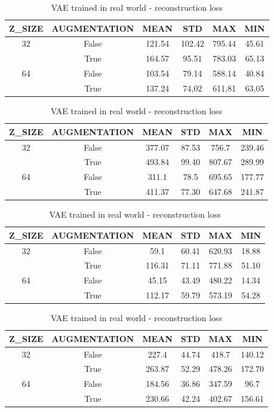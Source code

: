 \begin{table}
  \centering
  \begin{tabular}{|c|c||c|c|c|c|}
  \hline
  Z\_SIZE & AUGMENTATION & MEAN & STD & MAX & MIN \\ \hline
  \multirow{2}{*}{32} & False & 121.54 & 102.42 & 795.44 & 45.61 \\
  & True & 164.57 & 95.51 & 783.03 & 65.13  \\ \hline
  \multirow{2}{*}{64} & False & 103.54 & 79.14 & 588.14 & 40.84 \\
  & True & 137.24 & 74,02 & 611,81 & 63,05  \\ \hline
  \end{tabular}
  \caption{AE trained in simulation - reconstruction loss}
  \label{tab:aesim}

  \begin{tabular}{|c|c||c|c|c|c|}
  \hline
  Z\_SIZE & AUGMENTATION & MEAN & STD & MAX & MIN \\ \hline
  \multirow{2}{*}{32} & False & 377.07 & 87.53 & 756.7 & 239.46 \\
  & True & 493.84 & 99.40 & 807.67 & 289.99  \\ \hline
  \multirow{2}{*}{64} & False & 311.1 & 78.5 & 695.65 & 177.77 \\
  & True & 411.37 & 77.30 & 647.68 & 241.87 \\ \hline
  \end{tabular}
  \caption{AE trained in real world - reconstruction loss}
  \label{tab:aereal}

  \begin{tabular}{|c|c||c|c|c|c|}
  \hline
  Z\_SIZE & AUGMENTATION & MEAN & STD & MAX & MIN \\ \hline
  \multirow{2}{*}{32} & False & 59.1 & 60.41 & 620.93 & 18.88 \\
  & True & 116.31 & 71.11 & 771.88 & 51.10  \\ \hline
  \multirow{2}{*}{64} & False & 45.15 & 43.49 & 480.22 & 14.34 \\
  & True & 112.17 & 59.79 & 573.19 & 54.28  \\ \hline
  \end{tabular}
  \caption{VAE trained in simulation - reconstruction loss}
  \label{tab:vaesim}

  \begin{tabular}{|c|c||c|c|c|c|}
  \hline
  Z\_SIZE & AUGMENTATION & MEAN & STD & MAX & MIN \\ \hline
  \multirow{2}{*}{32} & False & 227.4 & 44.74 & 418.7 & 140.12 \\
  & True & 263.87 & 52.29 & 478.26 & 172.70 \\ \hline
  \multirow{2}{*}{64} & False & 184.56 & 36.86 & 347.59 & 96.7 \\
  & True & 230.66 & 42.24 & 402.67 & 156.61  \\ \hline
  \end{tabular}
  \caption{VAE trained in real world - reconstruction loss}
  \label{tab:vaereal}
\end{table}


